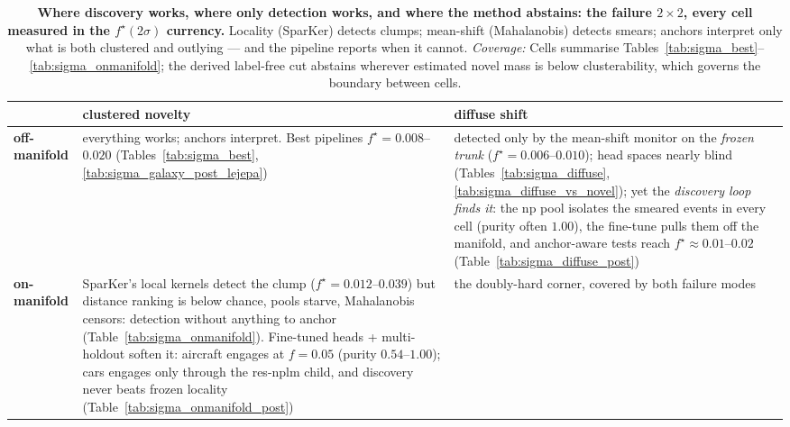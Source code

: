\begin{table}[t]
\centering
\small
\begin{tabular}{p{0.9in}p{3.6in}p{3.6in}}
\toprule
& \textbf{clustered novelty} & \textbf{diffuse shift} \\
\midrule
\textbf{off-manifold} & everything works; anchors interpret. Best pipelines $f^\star{=}0.008$--$0.020$ (Tables~\ref{tab:sigma_best}, \ref{tab:sigma_galaxy_post_lejepa}) & detected only by the mean-shift monitor on the \emph{frozen trunk} ($f^\star{=}0.006$--$0.010$); head spaces nearly blind (Tables~\ref{tab:sigma_diffuse}, \ref{tab:sigma_diffuse_vs_novel}); yet the \emph{discovery loop finds it}: the np pool isolates the smeared events in every cell (purity often $1.00$), the fine-tune pulls them off the manifold, and anchor-aware tests reach $f^\star{\approx}0.01$--$0.02$ (Table~\ref{tab:sigma_diffuse_post}) \\
\addlinespace
\textbf{on-manifold} & SparKer's local kernels detect the clump ($f^\star{=}0.012$--$0.039$) but distance ranking is below chance, pools starve, Mahalanobis censors: detection without anything to anchor (Table~\ref{tab:sigma_onmanifold}).  Fine-tuned heads + multi-holdout soften it: aircraft engages at $f{=}0.05$ (purity $0.54$--$1.00$); cars engages only through the res-nplm child, and discovery never beats frozen locality (Table~\ref{tab:sigma_onmanifold_post}) & the doubly-hard corner, covered by both failure modes \\
\bottomrule
\end{tabular}
\caption{\textbf{Where discovery works, where only detection works, and where the method abstains: the failure $2\times2$, every cell measured in the $f^\star(2\sigma)$ currency.}  Locality (SparKer) detects clumps; mean-shift (Mahalanobis) detects smears; anchors interpret only what is both clustered and outlying --- and the pipeline reports when it cannot. \emph{Coverage:} Cells summarise Tables~\ref{tab:sigma_best}--\ref{tab:sigma_onmanifold}; the derived label-free cut abstains wherever estimated novel mass is below clusterability, which governs the boundary between cells.}
\label{tab:sigma_failure2x2}
\end{table}

